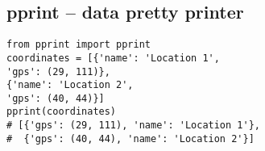 %

\subsection{pprint -- data pretty printer}
\begin{verbatim}
from pprint import pprint
coordinates = [{'name': 'Location 1',
'gps': (29, 111)},
{'name': 'Location 2',
'gps': (40, 44)}]
pprint(coordinates)
# [{'gps': (29, 111), 'name': 'Location 1'},
#  {'gps': (40, 44), 'name': 'Location 2'}]
\end{verbatim}

%